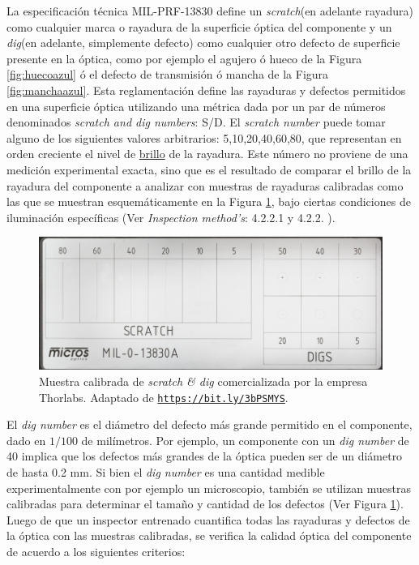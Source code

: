\hspace{0.5cm}La especificación técnica MIL-PRF-13830 define un \textit{scratch}(en adelante rayadura) como cualquier marca o rayadura de la superficie óptica del componente y un \textit{dig}(en adelante, simplemente defecto) como cualquier otro defecto de superficie presente en la óptica, como por ejemplo el agujero ó hueco de la Figura \ref{fig:huecoazul} ó el defecto de transmisión ó mancha de la Figura \ref{fig:manchaazul}. Esta reglamentación define las rayaduras y defectos permitidos en una superficie óptica utilizando una métrica dada por un par de números denominados \textit{scratch and dig numbers}: S/D. El \textit{scratch number} puede tomar alguno de los siguientes valores arbitrarios: 5,10,20,40,60,80, que representan en orden creciente el nivel de \underline{brillo} de la rayadura. Este número no proviene de una medición experimental exacta, sino que es el resultado de comparar el brillo de la rayadura del componente a analizar con muestras de rayaduras calibradas como las que se muestran esquemáticamente en la Figura \ref{fig:scratchanddig}, bajo ciertas condiciones de iluminación específicas (Ver \textit{Inspection method's}: 4.2.2.1 y 4.2.2. \cite{milprf}).
\begin{figure}[H]
	\centering
	\includegraphics[scale=0.8]{Figs/cuantificaciondefectos/paddlecalibration.png}
	\caption{Muestra calibrada de \textit{scratch \& dig} comercializada por la empresa Thorlabs. Adaptado de \href{https://www.thorlabs.com/newgrouppage9.cfm?objectgroup_id=1427&pn=MOTP-MIL}{\texttt{https://bit.ly/3bPSMYS}}.}
	\label{fig:scratchanddig}
\end{figure}
El \textit{dig number} es el diámetro del defecto más grande permitido en el componente, dado en $1/100$ de milímetros. Por ejemplo, un componente con un \textit{dig number} de 40 implica que los defectos más grandes de la óptica pueden ser de un diámetro de hasta 0.2 mm. Si bien el \textit{dig number} es una cantidad medible experimentalmente con por ejemplo un microscopio, también se utilizan muestras calibradas para determinar el tamaño y cantidad de los defectos (Ver Figura \ref{fig:scratchanddig}). Luego de que un inspector entrenado cuantifica todas las rayaduras y defectos de la óptica con las muestras calibradas, se verifica la calidad óptica del componente de acuerdo a los siguientes criterios:
